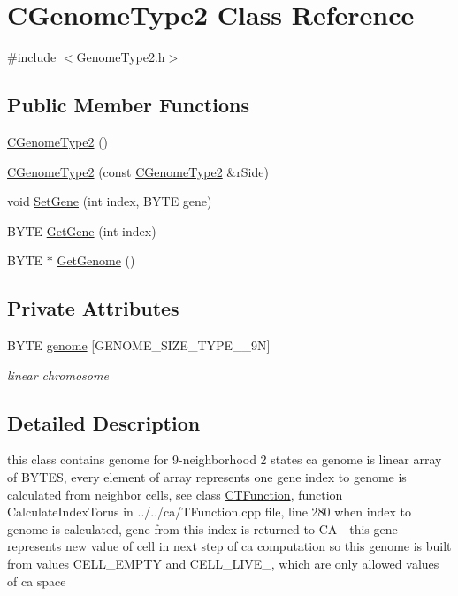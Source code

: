\hypertarget{classCGenomeType2}{
\section{CGenomeType2 Class Reference}
\label{classCGenomeType2}
}


{\ttfamily \#include $<$GenomeType2.h$>$}\subsection*{Public Member Functions}
\begin{DoxyCompactItemize}
\item 
\hyperlink{classCGenomeType2_a49dcf0302d8e83d51025c31fc07ee502}{CGenomeType2} ()
\item 
\hyperlink{classCGenomeType2_ac58b7ab43d29dac0816e25ccf4e7ccd4}{CGenomeType2} (const \hyperlink{classCGenomeType2}{CGenomeType2} \&rSide)
\item 
void \hyperlink{classCGenomeType2_ae1de66cbfe4425f371433caed2309eeb}{SetGene} (int index, BYTE gene)
\item 
BYTE \hyperlink{classCGenomeType2_adecff806abe734ca910115bc849046aa}{GetGene} (int index)
\item 
BYTE $\ast$ \hyperlink{classCGenomeType2_a2c6cbf1f56c6cbc5217c06f820712557}{GetGenome} ()
\end{DoxyCompactItemize}
\subsection*{Private Attributes}
\begin{DoxyCompactItemize}
\item 
\hypertarget{classCGenomeType2_a81d27bd3cd7ed600a89031ca5ef57b55}{
BYTE \hyperlink{classCGenomeType2_a81d27bd3cd7ed600a89031ca5ef57b55}{genome} \mbox{[}GENOME\_\-SIZE\_\-TYPE\_\_\-9N\mbox{]}}
\label{classCGenomeType2_a81d27bd3cd7ed600a89031ca5ef57b55}

\begin{DoxyCompactList}\small\item\em linear chromosome \item\end{DoxyCompactList}\end{DoxyCompactItemize}


\subsection{Detailed Description}
this class contains genome for 9-\/neighborhood 2 states ca genome is linear array of BYTES, every element of array represents one gene index to genome is calculated from neighbor cells, see class \hyperlink{classCTFunction}{CTFunction}, function CalculateIndexTorus in ../../ca/TFunction.cpp file, line 280 when index to genome is calculated, gene from this index is returned to CA -\/ this gene represents new value of cell in next step of ca computation so this genome is built from values CELL\_\-EMPTY and CELL\_\-LIVE\_, which are only allowed values of ca space 

